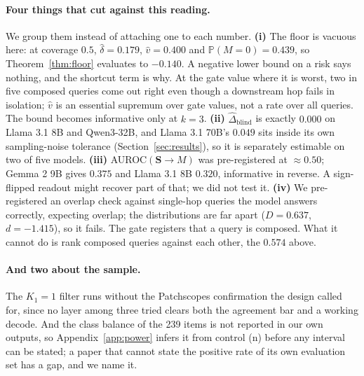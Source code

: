 \documentclass{article}
\newif\ifredflags
\newcommand{\rv}[1]{\ifredflags{\textcolor{red}{\textbf{[VERIFY: #1]}}}\fi}
\newcommand{\gate}{\mathbf{S}}
\begin{document}
\paragraph{Four things that cut against this reading.} We group them instead of attaching one to each
number. \textbf{(i)} The floor is vacuous here: at coverage $0.5$, $\widehat\delta=0.179$,
$\hat v=0.400$ and $\mathbb{P}(M{=}0)=0.439$, so Theorem~\ref{thm:floor} evaluates to $-0.140$. A
negative lower bound on a risk says nothing, and the shortcut term is why. At the gate value where it
is worst, two in five composed queries come out right even though a downstream hop fails in isolation;
$\hat v$ is an essential supremum over gate values, not a rate over all queries. The bound becomes
informative only at $k{=}3$. \textbf{(ii)} $\widehat{\Delta}_{\mathrm{blind}}$ is exactly $0.000$ on
Llama 3.1 8B and Qwen3-32B, and Llama 3.1 70B's $0.049$ sits inside its own sampling-noise tolerance
(Section~\ref{sec:results}), so it is separately estimable on two of five models. \textbf{(iii)}
AUROC$(\gate\!\to\!M)$ was pre-registered at $\approx0.50$; Gemma 2 9B gives $0.375$ and Llama 3.1 8B
$0.320$, informative in reverse. A sign-flipped readout might recover part of that; we did not test
it. \textbf{(iv)} We pre-registered an overlap check against single-hop queries the model answers
correctly, expecting overlap; the distributions are far apart ($D=0.637$, $d=-1.415$), so it fails.
The gate registers that a query is composed. What it cannot do is rank composed queries against each
other, the $0.574$ above.

\paragraph{And two about the sample.} The $K_1{=}1$ filter runs without the Patchscopes
\citep{ghandeharioun2024patchscopes} confirmation the design called for, since no layer among three
tried clears both the agreement bar and a working decode. And the class balance of the 239 items is
not reported in our own outputs, so Appendix~\ref{app:power} infers it from control (n) before any
interval can be stated; a paper that cannot state the positive rate of its own evaluation set has a
gap, and we name it.
\rv{control (a) reports AUROC$(\gate\!\to\!K_2)=0.777$ on composed queries for this model, and at
$k{=}2$ the quantity $M$ \emph{is} $K_2$, so $0.616$ and $0.777$ cannot both be right.}
\rv{$\mathbb{P}(M{=}0)=0.439$ means the model fails $44\%$ of city-to-country questions, which is high
enough that a labelling fault is at least as likely as a knowledge gap; control (h) found exact match
is systematically lenient, which pushes the true rate higher. Hand-audit 50 $K_2{=}0$ items.}
\end{document}
